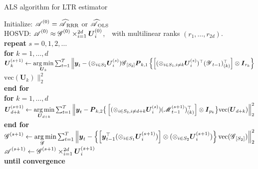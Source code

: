 \documentclass[12pt]{article}
\newcommand{\bm}{\boldsymbol}
\newcommand{\cm}[1]{\mbox{\boldmath$\mathscr{#1}$}}
\begin{document}
\begin{algorithm}[t]
  \caption{ALS algorithm for LTR estimator}
  \label{alg:LSE}
    Initialize: $\cm{A}^{(0)}=\cm{\widehat{A}}_{\textup{RRR}}$ or $\cm{\widehat{A}}_{\textup{OLS}}$\\ HOSVD: $\cm{A}^{(0)}\approx\cm{G}^{(0)}\times_{i=1}^{2d}\bm{U}_i^{(0)}$,~~with multilinear ranks $(r_1,\dots,r_{2d})$.\\
    \textbf{repeat} $s=0,1,2,\dots$\\
    \hspace*{0.5cm}\textbf{for} $k=1,\dots,d$\\
    \hspace*{1cm}$\bm{U}_k^{(s+1)}\leftarrow\underset{\bm{U}_k}{\arg\min}\sum_{t=1}^T\Big\|\bm{y}_t-(\otimes_{i\in S_2}\bm{U}_i^{(s)})\cm{G}_{[S_2]}\bm{P}_{k,1}  \left\{\left[(\otimes_{i\in S_1,i\neq k}\bm{U}_i^{(s)})^\top(\cm{Y}_{t-1})_{(k)}^\top\right]\otimes \bm{I}_{r_k}\right\}$\\
    \hspace*{5.5cm}$\text{vec}(\bm{U}_k)\Big\|_2^2$\\
    \hspace*{0.5cm}\textbf{end for}\\
    \hspace*{0.5cm}\textbf{for} $k=1,\dots,d$\\
    \hspace*{1cm}$\bm{U}_{d+k}^{(s+1)}\leftarrow\underset{\bm{U}_{d+k}}{\arg\min}\sum_{t=1}^T\Big\|\bm{y}_t-\bm{P}_{k,2}\big\{\left[(\otimes_{i\in S_2,i\neq d+k}\bm{U}_{i}^{(s)}) (\cm{M}^{(s+1)}_{t-1})_{(k)}^\top\right]\otimes\bm{I}_{p_{k}}\big\}\text{vec}(\bm{U}_{d+k})\Big\|_2^2$\\
    \hspace*{0.5cm}\textbf{end for}\\
    \hspace*{0.5cm}$\cm{G}^{(s+1)}\leftarrow \underset{\scalebox{0.75}{\cm{G}}}{\arg\min}\sum_{t=1}^T\Big\|\bm{y}_t-\left\{\left[\bm{y}_{t-1}^\top(\otimes_{i\in S_1}\bm{U}_i^{(s+1)})\right]\otimes(\otimes_{i\in S_2}\bm{U}_i^{(s+1)})\right\}\text{vec}(\cm{G}_{[S_2]})\Big\|_2^2$\\
    \hspace*{0.5cm}$\cm{A}^{(s+1)}\leftarrow\cm{G}^{(s+1)}\times_{i=1}^{2d}\bm{U}_i^{(s+1)}$\\
    \textbf{until convergence}
\end{algorithm}
\end{document}

